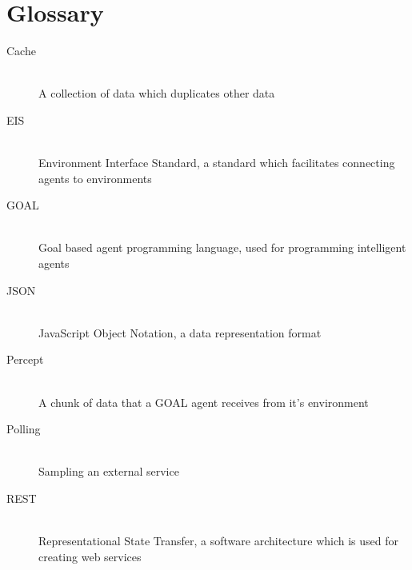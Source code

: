 \documentclass[a4paper]{article}
\begin{document}
\section{Glossary}
\begin{description}
\item[Cache] \hfill \\
A collection of data which duplicates other data
\item[EIS] \hfill \\
Environment Interface Standard, a standard which facilitates connecting agents to environments
\item[GOAL] \hfill \\
Goal based agent programming language, used for programming intelligent agents
\item[JSON] \hfill \\
JavaScript Object Notation, a data representation format
\item[Percept] \hfill \\
A chunk of data that a GOAL agent receives from it’s environment
\item[Polling] \hfill \\
Sampling an external service
\item[REST] \hfill \\
Representational State Transfer, a software architecture which is used for creating web services
\end{description}
\end{document}
